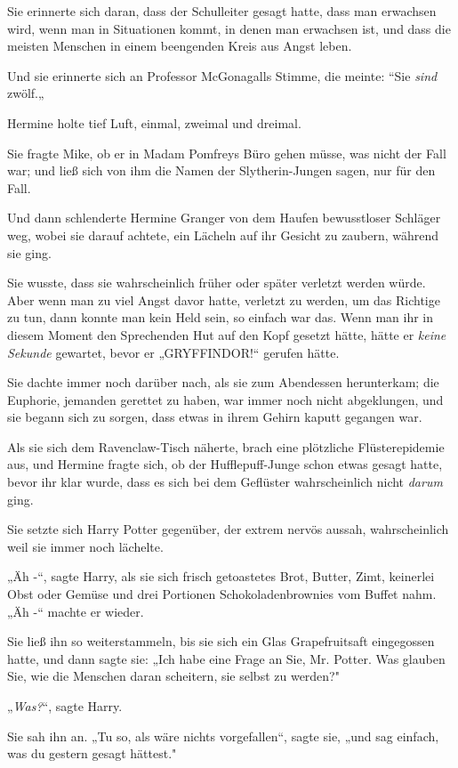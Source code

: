 {Sie erinnerte sich daran, dass der Schulleiter gesagt hatte, dass man erwachsen wird, wenn man in Situationen kommt, in denen man erwachsen ist, und dass die meisten Menschen in einem beengenden Kreis aus Angst leben.

Und sie erinnerte sich an Professor McGonagalls Stimme, die meinte: “Sie \emph{sind} zwölf.„

Hermine holte tief Luft, einmal, zweimal und dreimal.

Sie fragte Mike, ob er in Madam Pomfreys Büro gehen müsse, was nicht der Fall war; und ließ sich von ihm die Namen der Slytherin-Jungen sagen, nur für den Fall.

Und dann schlenderte Hermine Granger von dem Haufen bewusstloser Schläger weg, wobei sie darauf achtete, ein Lächeln auf ihr Gesicht zu zaubern, während sie ging.

Sie wusste, dass sie wahrscheinlich früher oder später verletzt werden würde. Aber wenn man zu viel Angst davor hatte, verletzt zu werden, um das Richtige zu tun, dann konnte man kein Held sein, so einfach war das. Wenn man ihr in diesem Moment den Sprechenden Hut auf den Kopf gesetzt hätte, hätte er \emph{keine Sekunde} gewartet, bevor er „GRYFFINDOR!“ gerufen hätte.

Sie dachte immer noch darüber nach, als sie zum Abendessen herunterkam; die Euphorie, jemanden gerettet zu haben, war immer noch nicht abgeklungen, und sie begann sich zu sorgen, dass etwas in ihrem Gehirn kaputt gegangen war.

Als sie sich dem Ravenclaw-Tisch näherte, brach eine plötzliche Flüsterepidemie aus, und Hermine fragte sich, ob der Hufflepuff-Junge schon etwas gesagt hatte, bevor ihr klar wurde, dass es sich bei dem Geflüster wahrscheinlich nicht \emph{darum} ging.

Sie setzte sich Harry Potter gegenüber, der extrem nervös aussah, wahrscheinlich weil sie immer noch lächelte.

„Äh -“, sagte Harry, als sie sich frisch getoastetes Brot, Butter, Zimt, keinerlei Obst oder Gemüse und drei Portionen Schokoladenbrownies vom Buffet nahm. „Äh -“ machte er wieder.

Sie ließ ihn so weiterstammeln, bis sie sich ein Glas Grapefruitsaft eingegossen hatte, und dann sagte sie: „Ich habe eine Frage an Sie, Mr. Potter. Was glauben Sie, wie die Menschen daran scheitern, sie selbst zu werden?"

„\emph{Was?}“, sagte Harry.

Sie sah ihn an. „Tu so, als wäre nichts vorgefallen“, sagte sie, „und sag einfach, was du gestern gesagt hättest."

}
